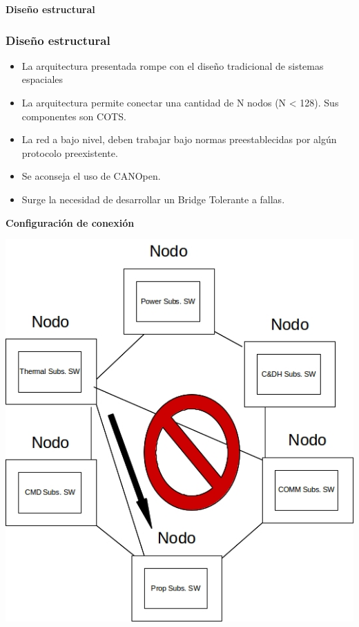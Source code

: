 \begin{frame}[c]
	\centering
	\LARGE \textbf{Diseño estructural}
\end{frame}

\begin{frame}
	\frametitle{Diseño estructural}
	\begin{itemize}
		\item La arquitectura presentada rompe con el diseño tradicional de sistemas espaciales
		\item La arquitectura permite conectar una cantidad de N nodos (N < 128). Sus componentes son COTS. 
		\item La red a bajo nivel, deben trabajar bajo normas preestablecidas por algún protocolo preexistente. 
		\item Se aconseja el uso de CANOpen.
		\item Surge la necesidad de desarrollar un Bridge Tolerante a fallas. 
	\end{itemize}
\end{frame}

\begin{frame}[c]
	\centering
	\LARGE \textbf{Configuración de conexión}
\end{frame}

\begin{frame}[c]
	\centering
	\includegraphics[scale=0.4]{images/Bridge1.jpg}
\end{frame}

